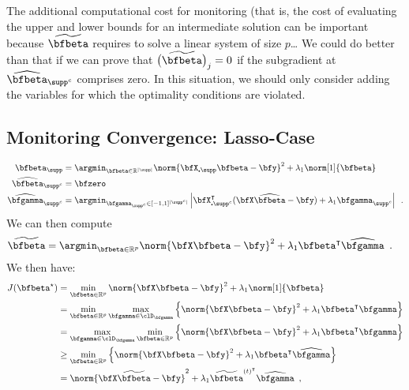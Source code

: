 
The additional computational cost for monitoring (that is, the cost of evaluating
the upper and lower bounds for an intermediate solution can be important because
$\widetilde{\bfbeta}$ requires to solve a linear system of size $p$\ldots 
We could do better than that if we can prove that $\big(\widetilde{\bfbeta}\big)_j=0$ if
the subgradient at  $\widehat\bfbeta_{\supp^c}$ comprises zero. In this situation, we 
should only consider adding the variables for which the optimality conditions
are violated.

\subsection{Monitoring Convergence: Lasso-Case}

\begin{align*}
  \bfbeta_\supp & = \argmin_{\bfbeta\in\mathbb{R}^{|\supp|}} 
                  \norm{\bfX_{\centerdot\supp} \bfbeta - \bfy}^2 + \lambda_1 \norm[1]{\bfbeta}
  \\
  \widehat\bfbeta_{\supp^c} & = \bfzero \\ 
  \widehat\bfgamma_{\supp^c} & = \argmin_{\bfgamma_{\supp^c} \in [-1,1]^{|\supp^c|}}
                           \left|  \bfX_{\centerdot\supp^c}^\intercal(\bfX\widehat\bfbeta-\bfy) + 
                             \lambda_1 \bfgamma_{\supp^c} \right|
    \enspace. 
\end{align*}
We can then compute 
\begin{align*}
  \widetilde{\bfbeta} & = \argmin_{\bfbeta\in\mathbb{R}^{p}} 
                  \norm{\bfX \bfbeta - \bfy}^2 + \lambda_1 \bfbeta^\intercal\widehat\bfgamma
    \enspace. 
\end{align*}
We then have:
\begin{align*}
J(\bfbeta^\star) & = \min_{\bfbeta\in\mathbb{R}^p} 
  \norm{\bfX \bfbeta - \bfy}^2 + \lambda_1  \norm[1]{\bfbeta} \\
  &= \min_{\bfbeta\in\mathbb{R}^p} \max_{\bfgamma \in \clD_{\bfgamma}}
      \Big\{ \norm{\bfX \bfbeta - \bfy}^2 + \lambda_1 \bfbeta^\intercal\bfgamma \Big\} \\
  &= \max_{\bfgamma \in \clD_{\bfgamma}} \min_{\bfbeta\in\mathbb{R}^p}
      \Big\{ \norm{\bfX \bfbeta - \bfy}^2 + \lambda_1 \bfbeta^\intercal\bfgamma \Big\} \\
  & \geq \min_{\bfbeta\in\mathbb{R}^p}
      \Big\{ \norm{\bfX \bfbeta - \bfy}^2 + \lambda_1 \bfbeta^\intercal\widehat\bfgamma \Big\}  \\
  & = \norm{\bfX \widetilde{\bfbeta} - \bfy}^2 + \lambda_1 \widetilde{\bfbeta}^{(t)^\intercal}\widehat\bfgamma
  \enspace,
\end{align*}
